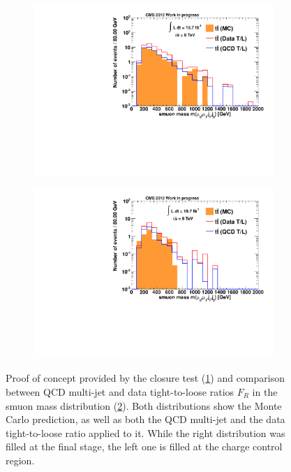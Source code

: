 \begin{figure}
  \centering
  \begin{subfigure}[b]{0.495\textwidth}
    \centering
    \includegraphics[width=\textwidth]{plots/closure_proof.pdf}
    \caption{\label{fig:closureproof}}
  \end{subfigure}
  \begin{subfigure}[b]{0.495\textwidth}
    \centering
    \includegraphics[width=\textwidth]{plots/closure_test.pdf}
    \caption{\label{fig:closurecomparison}}
  \end{subfigure}

  \caption{Proof of concept provided by the closure test (\ref{fig:closureproof}) and comparison between QCD multi-jet and data tight-to-loose ratios $F_R$ in the smuon mass distribution (\ref{fig:closurecomparison}). Both distributions show the Monte Carlo prediction, as well as both the QCD multi-jet and the data tight-to-loose ratio applied to it. While the right distribution was filled at the final stage, the left one is filled at the charge control region.}
  \label{fig:closuretest}
\end{figure}

